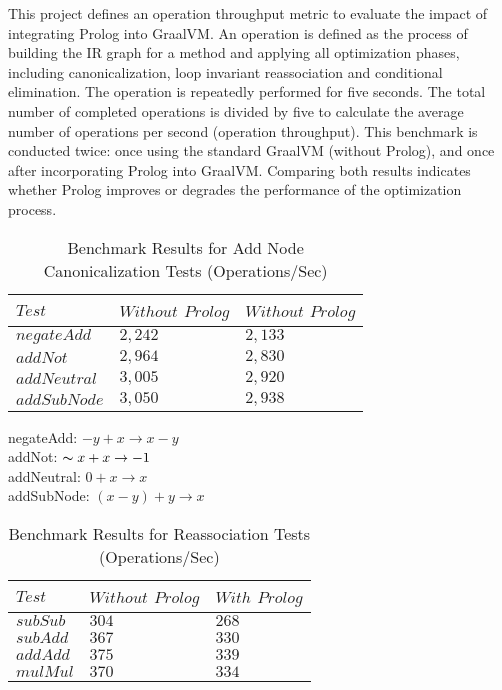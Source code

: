 This project defines an operation throughput metric to evaluate the impact of integrating Prolog into GraalVM. An operation is defined as the process of building the IR graph for a method and applying all optimization phases, including canonicalization, loop invariant reassociation and conditional elimination. The operation is repeatedly performed for five seconds. The total number of completed operations is divided by five to calculate the average number of operations per second (operation throughput). This benchmark is conducted twice: once using the standard GraalVM (without Prolog), and once after incorporating Prolog into GraalVM. Comparing both results indicates whether Prolog improves or degrades the performance of the optimization process.

\begin{table}[h]
    \centering
    \fontsize{9pt}{9pt}
    \begin{tabular}{|l|l|l|}
        \hline
        $Test$ & $Without$ $Prolog$ & $Without$ $Prolog$ \\
        \hline
        $negateAdd$ & $2,242$ & $2,133$ \\
        $addNot$ & $2,964$ & $2,830$ \\
        $addNeutral$ & $3,005$ & $2,920$ \\
        $addSubNode$ & $3,050$ & $2,938$ \\
        \hline
    \end{tabular}
    \caption{Benchmark Results for Add Node Canonicalization Tests (Operations/Sec)}
    \label{table:Canonicalization}
\end{table} 
\smallbreak

\noindent  negateAdd:  $-y + x \rightarrow x - y$\\
addNot: $\thicksim x + x \rightarrow -1$\\
addNeutral: $0 + x \rightarrow x$\\
addSubNode: $(x - y) + y \rightarrow x$\\

\begin{table}[h]
    \centering
    \fontsize{9pt}{9pt}
    \begin{tabular}{|l|l|l|}
        \hline
        $Test$ & $Without$ $Prolog$ & $With$ $Prolog$ \\
        \hline
        $subSub$ & $304$ & $268$ \\
        $subAdd$ & $367$ & $330$ \\
        $addAdd$ & $375$ & $339$ \\
        $mulMul$ & $370$ & $334$ \\
        \hline
    \end{tabular}
    \caption{Benchmark Results for Reassociation Tests (Operations/Sec)}
    \label{table:Reassociation}
\end{table}
\smallbreak

